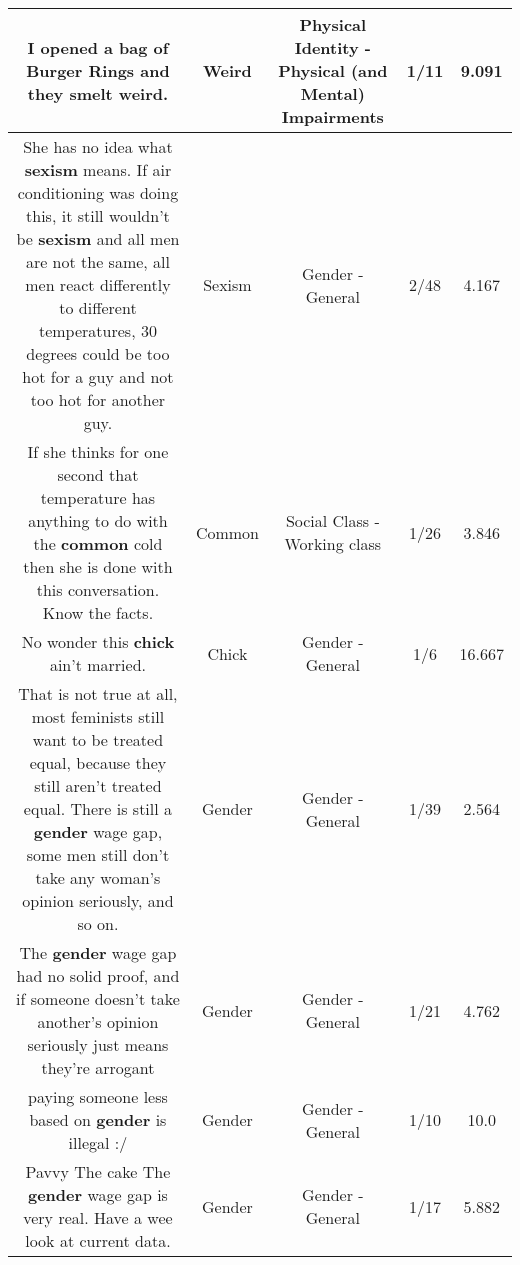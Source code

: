 \documentclass[11pt]{article}
\newlength\mylength
\begin{document}
\begin{center}
\begin{longtable}{|C{.65\mylength}|C{.30\mylength}|C{.12\mylength}|C{.12\mylength}|C{.12\mylength}|}
  \small I opened a bag of Burger Rings and they smelt \textbf{weird}.\normalsize   & Weird & Physical Identity - Physical (and Mental) Impairments & 1/11 & 9.091 \\  \hline
  \small She has no idea what \textbf{sexism} means. If air conditioning was doing this, it still wouldn't be \textbf{sexism} and all men are not the same, all men react differently to different temperatures, 30 degrees could be too hot for a guy and not too hot for another guy.\normalsize   & Sexism & Gender - General & 2/48 & 4.167 \\  \hline
  \small If she thinks for one second that temperature has anything to do with the \textbf{common} cold then she is done with this conversation. Know the facts.\normalsize   & Common & Social Class - Working class & 1/26 & 3.846 \\  \hline
  \small No wonder this \textbf{chick} ain't married.\normalsize   & Chick & Gender - General & 1/6 & 16.667 \\  \hline
  \small That is not true at all, most feminists still want to be treated equal, because they still aren't treated equal. There is still a \textbf{gender} wage gap, some men still don't take any woman's opinion seriously, and so on.\normalsize   & Gender & Gender - General & 1/39 & 2.564 \\  \hline
  \small {} The \textbf{gender} wage gap had no solid proof, and if someone doesn't take another's opinion seriously just means they're arrogant\normalsize   & Gender & Gender - General & 1/21 & 4.762 \\  \hline
  \small {} paying someone less based on \textbf{gender} is illegal :/\normalsize   & Gender & Gender - General & 1/10 & 10.0 \\  \hline
  \small Pavvy The cake The \textbf{gender} wage gap is very real. Have a wee look at current data.\normalsize   & Gender & Gender - General & 1/17 & 5.882 \\  \hline

\end{longtable}
\end{center}
\end{document}
